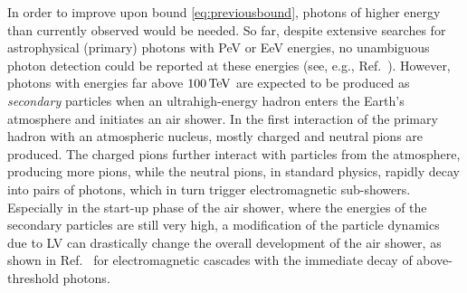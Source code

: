 \documentclass[aps,prd,preprint,longbibliography]{revtex4-1}
\begin{document}
In order to
improve upon bound \eqref{eq:previousbound}, photons of higher energy
than currently observed would be needed. So far, despite extensive
searches for astrophysical (primary) photons with PeV or EeV energies, no unambiguous photon
detection could be reported at these energies
(see, e.g., Ref.~\cite{Niechciol2017}).
However, photons with energies far above $\unit[100]{TeV}$
are expected to be produced as \emph{secondary} particles
when an ultrahigh-energy hadron enters the Earth's atmosphere and initiates an
air shower. In the first interaction of the primary hadron with an
atmospheric nucleus, mostly charged and neutral pions are
produced. The charged pions further interact with particles from the
atmosphere, producing more pions, while the neutral pions, in standard
physics, rapidly
decay into pairs of photons, which in turn trigger electromagnetic
sub-showers. Especially in the start-up phase of the air shower,
where the energies of the secondary particles are still very high,
a modification of the particle dynamics
due to LV can drastically change the overall development of the air shower, as shown in Ref.~\cite{DiazKlinkhamerRisse2016}
for electromagnetic cascades with the immediate decay of above-threshold photons.
\end{document}
